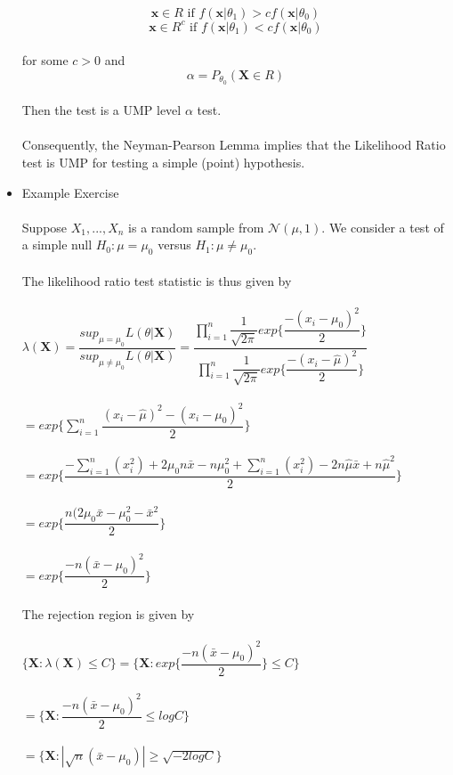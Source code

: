 \documentclass{article}
\begin{document}
\begin{itemize}
    $$\textbf{x}\in R\text{ if }f(\textbf{x}|\theta_1)>cf(\textbf{x}|\theta_0)$$
    $$\textbf{x}\in R^c\text{ if }f(\textbf{x}|\theta_1)<cf(\textbf{x}|\theta_0)$$\\
    for some $c>0$ and\\
    $$\alpha=P_{\theta_0}(\textbf{X}\in R)$$\\
    Then the test is a UMP level $\alpha$ test.\\\\
    Consequently, the Neyman-Pearson Lemma implies that the Likelihood Ratio test is UMP for testing a simple (point) hypothesis.
    \item Example Exercise\\\\
    Suppose $X_1,...,X_n$ is a random sample from $\mathcal{N}(\mu,1)$.  We consider a test of a simple null $H_0:\mu=\mu_0$ versus $H_1:\mu\neq\mu_0$.\\\\  
    The likelihood ratio test statistic is thus given by\\\\
    $\lambda(\textbf{X})=\dfrac{sup_{\mu=\mu_0}L(\theta|\textbf{X})}{sup_{\mu\neq\mu_0}L(\theta|\textbf{X})}=\dfrac{\prod_{i=1}^n\dfrac{1}{\sqrt{2\pi}}exp\{\dfrac{-(x_i-\mu_0)^2}{2}\}}{\prod_{i=1}^n\dfrac{1}{\sqrt{2\pi}}exp\{\dfrac{-(x_i-\hat{\mu})^2}{2}\}}$\\\\
    $=exp\{\sum_{i=1}^n\dfrac{(x_i-\hat{\mu})^2-(x_i-\mu_0)^2}{2}\}$\\\\
    $=exp\{\dfrac{-\sum_{i=1}^n(x_i^2)+2\mu_0n\bar{x}-n\mu_0^2+\sum_{i=1}^n(x_i^2)-2n\hat{\mu}\bar{x}+n\hat{\mu}^2}{2}\}$\\\\
    $=exp\{\dfrac{n(2\mu_0\bar{x}-\mu_0^2-\bar{x}^2}{2}\}$\\\\
    $=exp\{\dfrac{-n(\bar{x}-\mu_0)^2}{2}\}$\\\\
    The rejection region is given by\\\\
    $\{\textbf{X}:\lambda(\textbf{X})\leq C\}=\{\textbf{X}:exp\{\dfrac{-n(\bar{x}-\mu_0)^2}{2}\}\leq C\}$\\\\
    $=\{\textbf{X}:\dfrac{-n(\bar{x}-\mu_0)^2}{2}\leq logC\}$\\\\
    $=\{\textbf{X}:|\sqrt{n}(\bar{x}-\mu_0)|\geq\sqrt{-2logC}\}$\\\\

\end{itemize}
\end{document}
